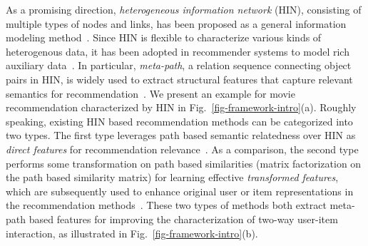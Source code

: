 As a promising direction, \emph{heterogeneous information network} (HIN), consisting of multiple types of nodes and links, has been proposed as a general information modeling method~\cite{sun2011pathsim,shi2017survey}.
Since HIN is flexible to characterize various kinds of heterogenous data, it has been adopted
  in recommender systems to model rich auxiliary data~\cite{zhao2017meta,yu2014personalized}.
In particular,  \emph{meta-path},  a relation sequence connecting object pairs in HIN, is widely used to extract structural features that capture relevant  semantics  for recommendation~\cite{sun2011pathsim}.
We present an example for movie recommendation characterized by HIN in Fig.~\ref{fig-framework-intro}(a).
Roughly speaking, existing HIN based recommendation methods can be categorized into two types.
The first type leverages path based semantic relatedness over HIN as \emph{direct features} for recommendation relevance~\cite{feng2012incorporating,yu2014personalized,shi2015semantic}.  %
As a comparison, the second type performs some transformation  on path based similarities (\eg matrix factorization on the path based similarity matrix) for learning effective \emph{transformed features}, which are subsequently used to enhance original user or item representations in the recommendation methods~\cite{yu2014personalized,zhao2017meta}.
These two types of methods both extract meta-path based features for improving the characterization of two-way user-item interaction, as illustrated in Fig.~\ref{fig-framework-intro}(b).



